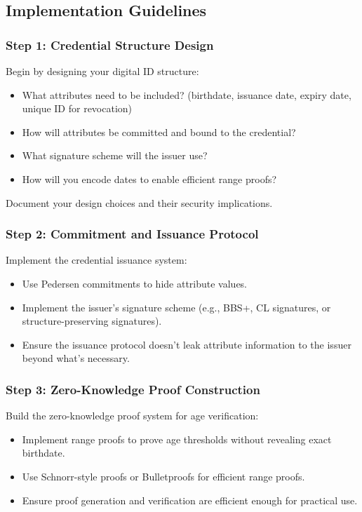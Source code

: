 \documentclass[10pt,a4paper,american]{exam}
\begin{document}
\subsection*{Implementation Guidelines}

\subsubsection*{Step 1: Credential Structure Design}
Begin by designing your digital ID structure:
\begin{itemize}
	\item What attributes need to be included? (birthdate, issuance date, expiry date, unique ID for revocation)
	\item How will attributes be committed and bound to the credential?
	\item What signature scheme will the issuer use?
	\item How will you encode dates to enable efficient range proofs?
\end{itemize}

Document your design choices and their security implications.

\subsubsection*{Step 2: Commitment and Issuance Protocol}
Implement the credential issuance system:
\begin{itemize}
	\item Use Pedersen commitments to hide attribute values.
	\item Implement the issuer's signature scheme (e.g., BBS+, CL signatures, or structure-preserving signatures).
	\item Ensure the issuance protocol doesn't leak attribute information to the issuer beyond what's necessary.
\end{itemize}

\subsubsection*{Step 3: Zero-Knowledge Proof Construction}
Build the zero-knowledge proof system for age verification:
\begin{itemize}
	\item Implement range proofs to prove age thresholds without revealing exact birthdate.
	\item Use Schnorr-style proofs or Bulletproofs for efficient range proofs.
	\item Ensure proof generation and verification are efficient enough for practical use.
\end{itemize}
\end{document}
